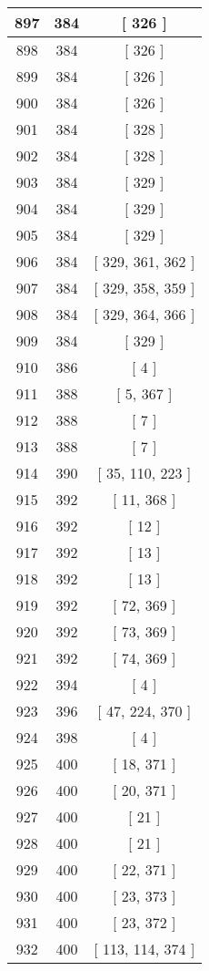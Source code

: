 \begin{center}
\begin{longtable}[H]{|| c c c ||}
\\\hline
897 & 384 & [ 326 ]
\\\hline
898 & 384 & [ 326 ]
\\\hline
899 & 384 & [ 326 ]
\\\hline
900 & 384 & [ 326 ]
\\\hline
901 & 384 & [ 328 ]
\\\hline
902 & 384 & [ 328 ]
\\\hline
903 & 384 & [ 329 ]
\\\hline
904 & 384 & [ 329 ]
\\\hline
905 & 384 & [ 329 ]
\\\hline
906 & 384 & [ 329, 361, 362 ]
\\\hline
907 & 384 & [ 329, 358, 359 ]
\\\hline
908 & 384 & [ 329, 364, 366 ]
\\\hline
909 & 384 & [ 329 ]
\\\hline
910 & 386 & [ 4 ]
\\\hline
911 & 388 & [ 5, 367 ]
\\\hline
912 & 388 & [ 7 ]
\\\hline
913 & 388 & [ 7 ]
\\\hline
914 & 390 & [ 35, 110, 223 ]
\\\hline
915 & 392 & [ 11, 368 ]
\\\hline
916 & 392 & [ 12 ]
\\\hline
917 & 392 & [ 13 ]
\\\hline
918 & 392 & [ 13 ]
\\\hline
919 & 392 & [ 72, 369 ]
\\\hline
920 & 392 & [ 73, 369 ]
\\\hline
921 & 392 & [ 74, 369 ]
\\\hline
922 & 394 & [ 4 ]
\\\hline
923 & 396 & [ 47, 224, 370 ]
\\\hline
924 & 398 & [ 4 ]
\\\hline
925 & 400 & [ 18, 371 ]
\\\hline
926 & 400 & [ 20, 371 ]
\\\hline
927 & 400 & [ 21 ]
\\\hline
928 & 400 & [ 21 ]
\\\hline
929 & 400 & [ 22, 371 ]
\\\hline
930 & 400 & [ 23, 373 ]
\\\hline
931 & 400 & [ 23, 372 ]
\\\hline
932 & 400 & [ 113, 114, 374 ]
\\\hline

\end{longtable}
\end{center}

